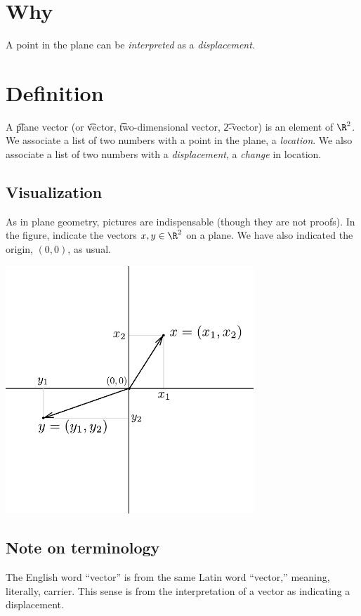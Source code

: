 

\section*{Why}

A point in the plane can be \textit{interpreted} as a \textit{displacement}.

\section*{Definition}

A \t{plane vector} (or \t{vector}, \t{two-dimensional vector}, \t{2-vector}) is an element of $\R ^2$.
We associate a list of two numbers with a point in the plane, a \textit{location}.
We also associate a list of two numbers with a \textit{displacement}, a \textit{change} in location.

\subsection*{Visualization}

As in plane geometry, pictures are indispensable (though they are not proofs).
In the figure, indicate the vectors $x, y \in \R ^2$ on a plane.
We have also indicated the origin, $(0, 0)$, as usual.
\begin{center}  \includegraphics[width=0.70\textwidth]{./graphics/vector_components.pdf}\end{center}

\subsection*{Note on terminology}

The English word ``vector'' is from the same Latin word ``vector,'' meaning, literally, carrier.
This sense is from the interpretation of a vector as indicating a displacement.
